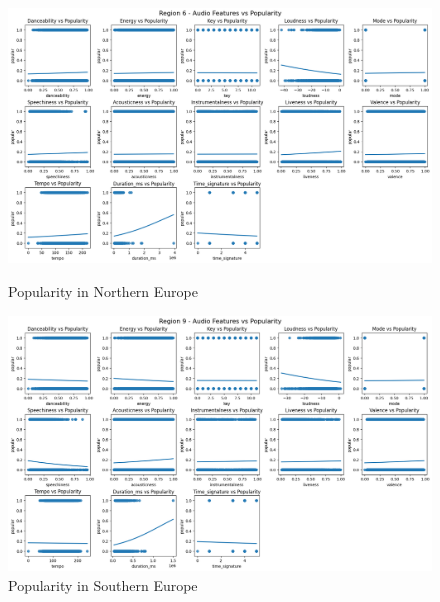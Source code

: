 \begin{figure}[h]
    \centering
    \begin{minipage}{0.45\textwidth}
        \centering
        \includegraphics[width=\linewidth]{media/region6_cleaned.png}
        \caption{Popularity in Northern Europe}
        \label{northern_europe}
    \end{minipage}%
    \hspace{0.05\textwidth}
    \begin{minipage}{0.45\textwidth}
        \centering
        \includegraphics[width=\linewidth]{media/region9_cleaned.png}
        \caption{Popularity in Southern Europe}
        \label{southern_europe}
    \end{minipage}
    
    \vspace{0.05\textwidth}
    

\end{figure}
